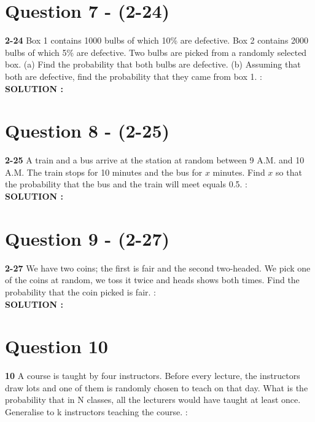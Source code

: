 \documentclass{article}
\begin{document}
\section{Question 7 - (2-24)}
\label{Q7}
\textbf{2-24}  Box 1 contains 1000 bulbs of which 10\% are defective. Box 2 contains 2000 bulbs of which 5\% are defective. Two bulbs are picked from a randomly selected box. (a) Find the probability that both bulbs are defective. (b) Assuming that both are defective, find the probability that they came from box 1.  : \\

\hspace{1em} \large{\textbf{SOLUTION :}} \\

\section{Question 8 - (2-25)}
\label{Q8}
\textbf{2-25} A train and a bus arrive at the station at random between 9 A.M. and 10 A.M. The train stops for 10 minutes and the bus for $x$ minutes. Find $x$ so that the probability that the bus and the train will meet equals 0.5. : \\

\hspace{1em} \large{\textbf{SOLUTION :}} \\

\section{Question 9 - (2-27)}
\label{Q9}
\textbf{2-27} We have two coins; the first is fair and the second two-headed. We pick one of the coins at random, we toss it twice and heads shows both times. Find the probability that the coin picked is fair.  : \\

\hspace{1em} \large{\textbf{SOLUTION :}} \\

\section{Question 10}
\label{Q10}
\textbf{10} A course is taught by four instructors. Before every lecture, the instructors draw lots and one of them is randomly chosen to teach on that day. What is the probability that in N classes, all the lecturers would have taught at least once. Generalise to k instructors teaching the course. : \\
\end{document}
